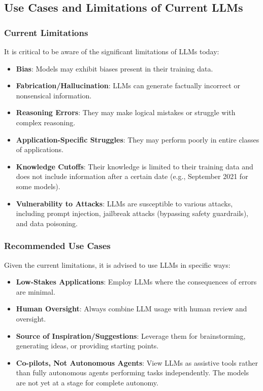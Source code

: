 \subsection{Use Cases and Limitations of Current LLMs}

\subsubsection{Current Limitations}

It is critical to be aware of the significant limitations of LLMs today:
\begin{itemize}
    \item \textbf{Bias}: Models may exhibit biases present in their training data.
    \item \textbf{Fabrication/Hallucination}: LLMs can generate factually incorrect or nonsensical information.
    \item \textbf{Reasoning Errors}: They may make logical mistakes or struggle with complex reasoning.
    \item \textbf{Application-Specific Struggles}: They may perform poorly in entire classes of applications.
    \item \textbf{Knowledge Cutoffs}: Their knowledge is limited to their training data and does not include information after a certain date (e.g., September 2021 for some models).
    \item \textbf{Vulnerability to Attacks}: LLMs are susceptible to various attacks, including prompt injection, jailbreak attacks (bypassing safety guardrails), and data poisoning.
\end{itemize}

\subsubsection{Recommended Use Cases}

Given the current limitations, it is advised to use LLMs in specific ways:
\begin{itemize}
    \item \textbf{Low-Stakes Applications}: Employ LLMs where the consequences of errors are minimal.
    \item \textbf{Human Oversight}: Always combine LLM usage with human review and oversight.
    \item \textbf{Source of Inspiration/Suggestions}: Leverage them for brainstorming, generating ideas, or providing starting points.
    \item \textbf{Co-pilots, Not Autonomous Agents}: View LLMs as assistive tools rather than fully autonomous agents performing tasks independently. The models are not yet at a stage for complete autonomy.
\end{itemize}

